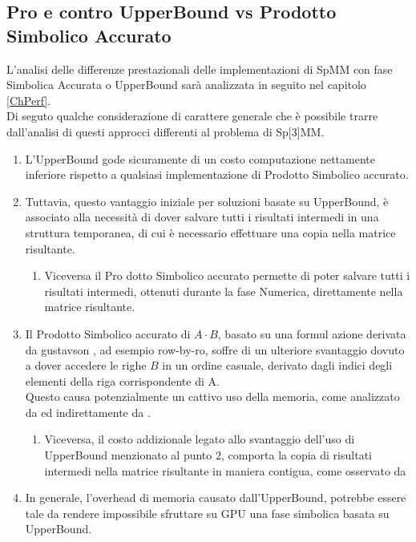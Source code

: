 \subsection{Pro e contro UpperBound vs Prodotto Simbolico Accurato} \label{chSpMMSymb:UB_VS_SYMBACC}
L'analisi delle differenze prestazionali delle implementazioni di SpMM con fase Simbolica Accurata o UpperBound
sarà analizzata in seguito nel capitolo \ref{ChPerf}.\\
Di seguto qualche considerazione di carattere generale che è possibile trarre dall'analisi di questi approcci differenti
al problema di Sp[3]MM.\\
\begin{enumerate}
	\item L'UpperBound gode sicuramente di un costo computazione nettamente inferiore 
	      rispetto a qualsiasi implementazione di Prodotto Simbolico accurato.\\
	\item Tuttavia, questo vantaggio iniziale per soluzioni basate su UpperBound, 
		  è associato alla necessità di dover salvare tutti i risultati intermedi in una struttura temporanea,
		  di cui è necessario effettuare una copia nella matrice risultante.
	\begin{enumerate}
		\item Viceversa il Pro dotto Simbolico accurato permette di poter salvare tutti i risultati intermedi,
			  ottenuti durante la fase Numerica, direttamente nella matrice risultante.
	\end{enumerate}
	\item Il Prodotto Simbolico  accurato di $A \cdot B$, 
		  basato su una formul azione derivata da gustavson \cite{gustavson}, ad esempio row-by-ro,
		  soffre di un ulteriore svantaggio dovuto a dover accedere le righe $B$ in un ordine casuale, derivato 
		  dagli indici degli elementi \nnz della riga corrispondente di A.\\
		  Questo causa potenzialmente un cattivo uso della memoria, come analizzato da 
		  \cite{Sp3MM4AMG} ed indirettamente da \cite{ESC}.
		\begin{enumerate}
			\label{chSpMMSymb:UB_VS_SYMBACC_rowbyrowContiguousCopyBack}
			\item Viceversa, il costo addizionale legato allo svantaggio dell'uso di UpperBound menzionato al punto 2, 
				  comporta la copia di risultati intermedi 
				  nella matrice risultante in maniera contigua, come osservato da \cite{Sp3MM4AMG}
		\end{enumerate}
	\item In generale, l'overhead di memoria causato dall'UpperBound, potrebbe essere tale da rendere impossibile 
		  sfruttare su GPU una fase simbolica basata su UpperBound. %
\end{enumerate}

